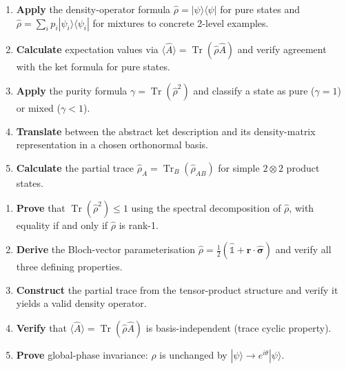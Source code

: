 \documentclass[11pt,a4paper]{article}
\begin{document}
\medskip
\begin{tcolorbox}[ugconceptbox,title={Tier 2 (BegUG) --- By the end of this lecture, you should be able to\ldots}]
\begin{enumerate}[leftmargin=1.8em,itemsep=3pt]
  \item \textbf{Apply} the density-operator formula $\hat{\rho}=|\psi\rangle\langle\psi|$
        for pure states and $\hat{\rho}=\sum_i p_i|\psi_i\rangle\langle\psi_i|$ for
        mixtures to concrete 2-level examples.
  \item \textbf{Calculate} expectation values via $\langle\hat{A}\rangle=\operatorname{Tr}(\hat{\rho}\hat{A})$
        and verify agreement with the ket formula for pure states.
  \item \textbf{Apply} the purity formula $\gamma=\operatorname{Tr}(\hat{\rho}^2)$ and classify a
        state as pure ($\gamma=1$) or mixed ($\gamma<1$).
  \item \textbf{Translate} between the abstract ket description and its density-matrix
        representation in a chosen orthonormal basis.
  \item \textbf{Calculate} the partial trace $\hat{\rho}_A=\operatorname{Tr}_B(\hat{\rho}_{AB})$
        for simple $2\otimes 2$ product states.
\end{enumerate}
\end{tcolorbox}

\medskip
\begin{tcolorbox}[ugconceptbox,title={Tier 3 (AdvUG) --- By the end of this lecture, you should be able to\ldots}]
\begin{enumerate}[leftmargin=1.8em,itemsep=3pt]
  \item \textbf{Prove} that $\operatorname{Tr}(\hat{\rho}^2)\le 1$ using the spectral
        decomposition of $\hat{\rho}$, with equality if and only if $\hat{\rho}$ is rank-1.
  \item \textbf{Derive} the Bloch-vector parameterisation
        $\hat{\rho}=\tfrac{1}{2}(\hat{\mathbb{1}}+\mathbf{r}\cdot\hat{\boldsymbol{\sigma}})$
        and verify all three defining properties.
  \item \textbf{Construct} the partial trace from the tensor-product structure and
        verify it yields a valid density operator.
  \item \textbf{Verify} that $\langle\hat{A}\rangle=\operatorname{Tr}(\hat{\rho}\hat{A})$
        is basis-independent (trace cyclic property).
  \item \textbf{Prove} global-phase invariance: $\hat{\rho}$ is unchanged by
        $|\psi\rangle\to e^{i\theta}|\psi\rangle$.
\end{enumerate}
\end{tcolorbox}
\end{document}
